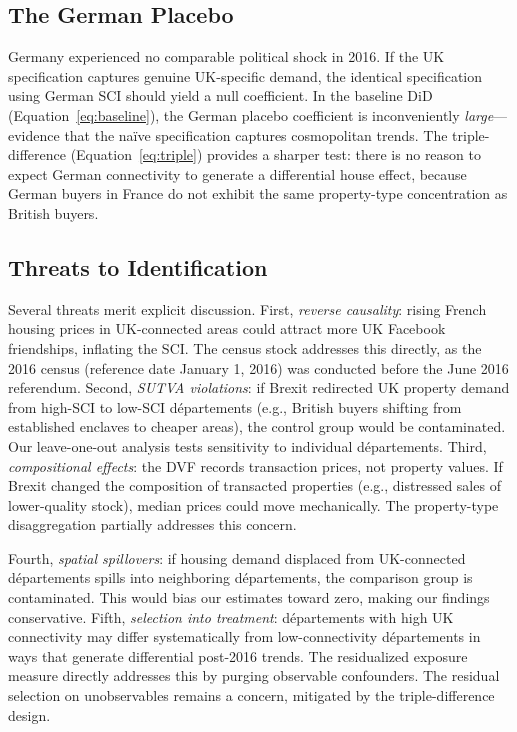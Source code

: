 \documentclass[12pt]{article}
\begin{document}
\subsection{The German Placebo}

Germany experienced no comparable political shock in 2016. If the UK specification captures genuine UK-specific demand, the identical specification using German SCI should yield a null coefficient. In the baseline DiD (Equation~\ref{eq:baseline}), the German placebo coefficient is inconveniently \textit{large}---evidence that the na\"ive specification captures cosmopolitan trends. The triple-difference (Equation~\ref{eq:triple}) provides a sharper test: there is no reason to expect German connectivity to generate a differential house effect, because German buyers in France do not exhibit the same property-type concentration as British buyers.

\subsection{Threats to Identification}

Several threats merit explicit discussion. First, \textit{reverse causality}: rising French housing prices in UK-connected areas could attract more UK Facebook friendships, inflating the SCI. The census stock addresses this directly, as the 2016 census (reference date January 1, 2016) was conducted before the June 2016 referendum. Second, \textit{SUTVA violations}: if Brexit redirected UK property demand from high-SCI to low-SCI d\'epartements (e.g., British buyers shifting from established enclaves to cheaper areas), the control group would be contaminated. Our leave-one-out analysis tests sensitivity to individual d\'epartements. Third, \textit{compositional effects}: the DVF records transaction prices, not property values. If Brexit changed the composition of transacted properties (e.g., distressed sales of lower-quality stock), median prices could move mechanically. The property-type disaggregation partially addresses this concern.

Fourth, \textit{spatial spillovers}: if housing demand displaced from UK-connected d\'epartements spills into neighboring d\'epartements, the comparison group is contaminated. This would bias our estimates toward zero, making our findings conservative. Fifth, \textit{selection into treatment}: d\'epartements with high UK connectivity may differ systematically from low-connectivity d\'epartements in ways that generate differential post-2016 trends. The residualized exposure measure directly addresses this by purging observable confounders. The residual selection on unobservables remains a concern, mitigated by the triple-difference design.
\end{document}
